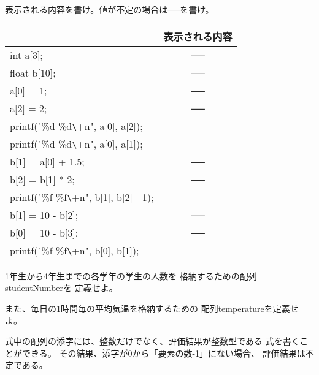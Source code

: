 \documentclass[12pt,a4j]{jarticle}
\newcounter{toi}
\def\toi{%
\bigskip\bigskip\noindent
\addtocounter{toi}{1}
\shadowbox{\bfseries\large 問\thetoi}
\nopagebreak[4]\bigskip\nopagebreak[4]
}
\begin{document}
表示される内容を書け。値が不定の場合は──を書け。
\begin{center}
 \ttfamily%
 \begin{tabular}{|l|c@{\hspace{3cm}}|} \hline
   & 表示される内容\\ \hline\hline
  int a[3]; & ──\\ 
  float b[10]; & ──\\
  a[0] = 1; & ──\\ 
  a[2] = 2; & ──\\ \cline{2-2}
  printf("\%d \%d\verb+\+n", a[0], a[2]);& \\ \cline{2-2}
  printf("\%d \%d\verb+\+n", a[0], a[1]);& \\  \cline{2-2}
  b[1] = a[0] + 1.5;& ──\\
  b[2] = b[1] * 2;& ──\\  \cline{2-2}
  printf("\%f \%f\verb+\+n", b[1], b[2] - 1);& \\ \cline{2-2}
  b[1] = 10 - b[2];& ──\\ 
  b[0] = 10 - b[3];& ──\\ \cline{2-2}
  printf("\%f \%f\verb+\+n", b[0], b[1]);& \\ \hline
 \end{tabular}
\end{center}








\toi

1年生から4年生までの各学年の学生の人数を
格納するための配列{\ttfamily studentNumber}を
定義せよ。

また、毎日の1時間毎の平均気温を格納するための
配列{\ttfamily temperature}を定義せよ。









\toi

式中の配列の添字には、整数だけでなく、評価結果が整数型である
式を書くことができる。
その結果、添字が0から「要素の数-1」にない場合、
評価結果は不定である。
\end{document}
